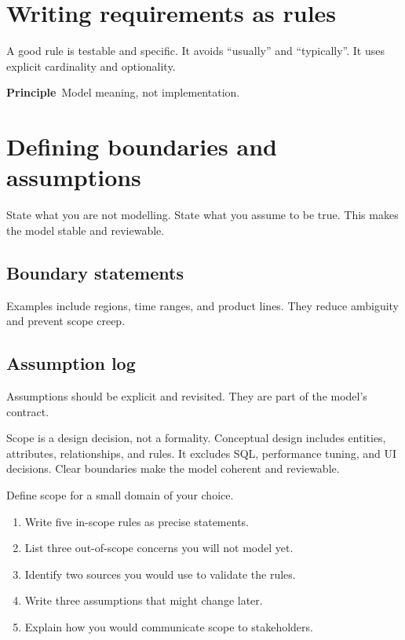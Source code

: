 \section{Writing requirements as rules}
A good rule is testable and specific.
It avoids “usually” and “typically”.
It uses explicit cardinality and optionality.

\begin{principlebox}
\textbf{Principle}\
Model meaning, not implementation.
\end{principlebox}

\section{Defining boundaries and assumptions}
State what you are not modelling.
State what you assume to be true.
This makes the model stable and reviewable.

\subsection{Boundary statements}
Examples include regions, time ranges, and product lines.
They reduce ambiguity and prevent scope creep.

\subsection{Assumption log}
Assumptions should be explicit and revisited.
They are part of the model’s contract.

\begin{chaptersummary}
Scope is a design decision, not a formality.
Conceptual design includes entities, attributes, relationships, and rules.
It excludes SQL, performance tuning, and UI decisions.
Clear boundaries make the model coherent and reviewable.
\end{chaptersummary}

\begin{exercisebox}
Define scope for a small domain of your choice.
\begin{enumerate}[label=\arabic*.]
  \item Write five in-scope rules as precise statements.
  \item List three out-of-scope concerns you will not model yet.
  \item Identify two sources you would use to validate the rules.
  \item Write three assumptions that might change later.
  \item Explain how you would communicate scope to stakeholders.
\end{enumerate}
\end{exercisebox}
